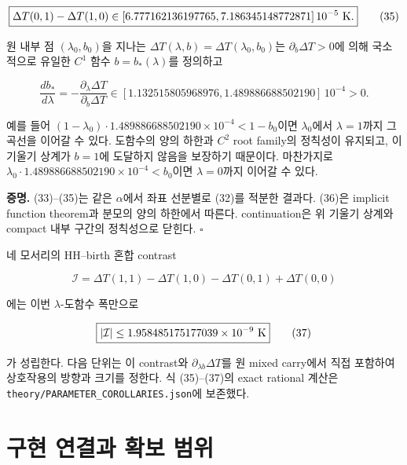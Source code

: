 \[
\boxed{\Delta T(0,1)-\Delta T(1,0)
\in[6.777162136197765,7.186345148772871]\,10^{-5}\ {\rm K}.}
\tag{35}
\]

원 내부 점 \((\lambda_0,b_0)\)을 지나는 \(\Delta T(\lambda,b)=\Delta T(\lambda_0,b_0)\)는 \(\partial_b\Delta T>0\)에 의해 국소적으로 유일한 \(C^1\) 함수 \(b=b_*(\lambda)\)를 정의하고

\[
\boxed{\frac{db_*}{d\lambda}=-\frac{\partial_\lambda\Delta T}{\partial_b\Delta T}
\in[1.132515805968976,1.489886688502190]\,10^{-4}>0.}
\tag{36}
\]

예를 들어 \((1-\lambda_0)\cdot1.489886688502190\times10^{-4}<1-b_0\)이면 \(\lambda_0\)에서 \(\lambda=1\)까지 그 곡선을 이어갈 수 있다. 도함수의 양의 하한과 \(C^2\) root family의 정칙성이 유지되고, 이 기울기 상계가 \(b=1\)에 도달하지 않음을 보장하기 때문이다. 마찬가지로 \(\lambda_0\cdot1.489886688502190\times10^{-4}<b_0\)이면 \(\lambda=0\)까지 이어갈 수 있다.

\textbf{증명.} (33)--(35)는 같은 \(\alpha\)에서 좌표 선분별로 (32)를 적분한 결과다. (36)은 implicit function theorem과 분모의 양의 하한에서 따른다. continuation은 위 기울기 상계와 compact 내부 구간의 정칙성으로 닫힌다. \(\square\)

네 모서리의 HH--birth 혼합 contrast

\[
\mathcal I=\Delta T(1,1)-\Delta T(1,0)-\Delta T(0,1)+\Delta T(0,0)
\]

에는 이번 \(\lambda\)-도함수 폭만으로

\[
\boxed{|\mathcal I|\le1.958485175177039\times10^{-9}\ {\rm K}}
\tag{37}
\]

가 성립한다. 다음 단위는 이 contrast와 \(\partial_{\lambda b}\Delta T\)를 원 mixed carry에서 직접 포함하여 상호작용의 방향과 크기를 정한다. 식 (35)--(37)의 exact rational 계산은 \nolinkurl{theory/PARAMETER_COROLLARIES.json}에 보존했다.

\hypertarget{uxad6cuxd604-uxc5f0uxacb0uxacfc-uxd655uxbcf4-uxbc94uxc704}{%
\section{구현 연결과 확보 범위}\label{uxad6cuxd604-uxc5f0uxacb0uxacfc-uxd655uxbcf4-uxbc94uxc704}}

